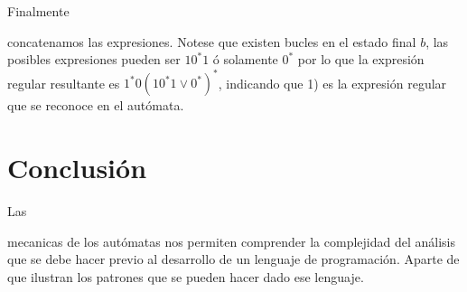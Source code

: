 \documentclass[stu, 12pt, letterpaper, donotrepeattitle, floatsintext, natbib]{apa7}
\begin{document}
Finalmente \begin{justifying}
    concatenamos las expresiones. Notese que existen bucles en el estado final \(b\), las posibles expresiones pueden ser 
\(10^*1\) ó solamente \(0^*\) por lo que la expresión regular resultante es \(1^*0(10^*1\lor 0^*)^*\), indicando que 1) es la
expresión regular que se reconoce en el autómata.\par
\end{justifying}
\vspace{\baselineskip}
\section{Conclusión}
Las \begin{justifying}
    mecanicas de los autómatas nos permiten comprender la complejidad del análisis que se debe hacer previo al desarrollo
    de un lenguaje de programación. Aparte de que ilustran los patrones que se pueden hacer dado ese lenguaje.\par
    \end{justifying}
\end{document}
